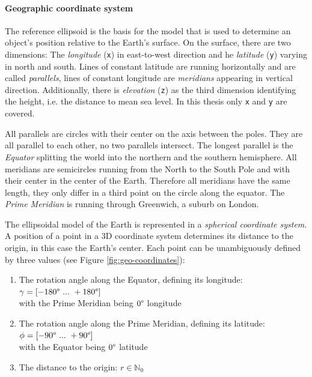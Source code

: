 \paragraph{Geographic coordinate system} %
\label{par:geographic_coordinate_system}

The reference ellipsoid is the basis for the model that is used to determine an object's position relative to the Earth's surface. On the surface, there are two dimensions: The \emph{longitude} (\texttt{x}) in east-to-west direction and he \emph{latitude} (\texttt{y}) varying in north and south. Lines of constant latitude are running horizontally and are called \emph{parallels}, lines of constant longitude are \emph{meridians} appearing in vertical direction. Additionally, there is \emph{elevation} (\texttt{z}) as the third dimension identifying the height, i.e. the distance to mean sea level. In this thesis only \texttt{x} and \texttt{y} are covered.

All parallels are circles with their center on the axis between the poles. They are all parallel to each other, no two parallels intersect. The longest parallel is the \emph{Equator} splitting the world into the northern and the southern hemisphere.
All meridians are semicircles running from the North to the South Pole and with their center in the center of the Earth. Therefore all meridians have the same length, they only differ in a third point on the circle along the equator. The \emph{Prime Meridian} is running through Greenwich, a suburb on London.

The ellipsoidal model of the Earth is represented in a \emph{spherical coordinate system}. A position of a point in a 3D coordinate system determines its distance to the origin, in this case the Earth's center. Each point can be unambiguously defined by three values
(see Figure \ref{fig:geo-coordinates}):

\begin{enumerate}
  \item The rotation angle along the Equator, defining its longitude: $\gamma = [-180\degree ~...~ +180\degree]$ \\
  with the Prime Meridian being $0\degree$ longitude
  \item The rotation angle along the Prime Meridian, defining its latitude: $\phi = [-90\degree ~...~ +90\degree]$ \\
  with the Equator being $0\degree$ latitude
  \item The distance to the origin: $r \in \mathbb{N}_0$ \hfill
  \cite[pp. 26-28]{bolstad2008gis}
\end{enumerate}

